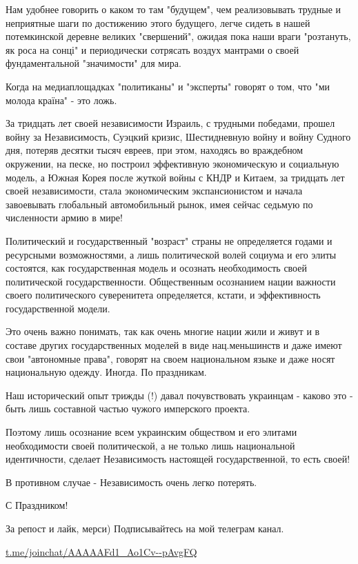 Нам удобнее говорить о каком то там "будущем", чем реализовывать трудные и
неприятные шаги по достижению этого будущего, легче сидеть в нашей потемкинской
деревне великих "свершений", ожидая пока наши враги "розтануть, як роса на
сонці" и периодически сотрясать воздух мантрами о своей фундаментальной
"значимости" для мира.

Когда на медиаплощадках "политиканы" и "эксперты" говорят о том, что "ми молода
країна" - это ложь. 

За тридцать лет своей независимости Израиль, с трудными победами, прошел войну
за Независимость, Суэцкий кризис, Шестидневную войну и войну Судного дня,
потеряв десятки тысяч евреев, при этом, находясь во враждебном окружении, на
песке, но построил эффективную экономическую и социальную модель, а Южная Корея
после жуткой войны с КНДР и Китаем, за тридцать лет своей независимости, стала
экономическим экспансионистом и начала завоевывать глобальный автомобильный
рынок, имея сейчас седьмую по численности армию в мире!

Политический и государственный "возраст" страны не определяется годами и
ресурсными возможностями, а лишь политической волей социума и его элиты
состоятся, как государственная модель и осознать необходимость своей
политической государственности. Общественным осознанием нации важности своего
политического суверенитета определяется, кстати, и эффективность
государственной модели.

Это очень важно понимать, так как очень многие нации жили и живут и в составе
других государственных моделей в виде нац.меньшинств и даже имеют свои
"автономные права", говорят на своем национальном языке и даже носят
национальную одежду. Иногда. По праздникам. 

Наш исторический опыт трижды (!) давал почувствовать украинцам - каково это -
быть лишь составной частью чужого имперского проекта.

Поэтому лишь осознание всем украинским обществом и его элитами необходимости
своей политической, а не только лишь национальной идентичности, сделает
Независимость настоящей государственной, то есть своей! 

В противном случае - Независимость очень легко потерять.

С Праздником!

За репост и лайк, мерси) Подписывайтесь на мой телеграм канал.

\url{t.me/joinchat/AAAAAFd1_Ao1Cv--pAvgFQ}

